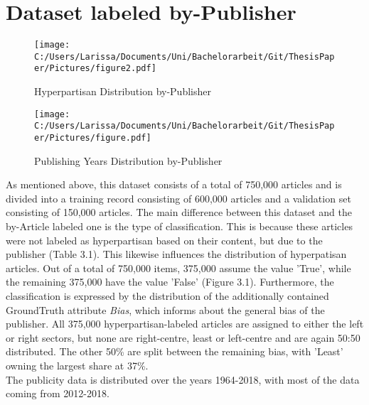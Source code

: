 \documentclass[a4paper, 11pt,titlepage,oneside,openany]{book}
\begin{document}
\section{Dataset labeled by-Publisher}
\begin{figure}[h]
	\begin{minipage}{.45\linewidth}
		\texttt{[image: C:/Users/Larissa/Documents/Uni/Bachelorarbeit/Git/ThesisPaper/Pictures/figure2.pdf]}
		\caption{Hyperpartisan Distribution by-Publisher}
	\end{minipage}
	\hspace{.1\linewidth}%
	\begin{minipage}{.45\linewidth}
		\texttt{[image: C:/Users/Larissa/Documents/Uni/Bachelorarbeit/Git/ThesisPaper/Pictures/figure.pdf]}
		\caption{Publishing Years Distribution by-Publisher}
	\end{minipage}
\end{figure} As mentioned above, this dataset consists of a total of 750,000 articles and is divided into a training record consisting of 600,000 articles and a validation set consisting of 150,000 articles.
The main difference between this dataset and the by-Article labeled one is the type of classification. This is because these articles were not labeled as hyperpartisan based on their content, but due to the publisher (Table 3.1). This likewise influences the distribution of hyperpatisan articles.
 Out of a total of 750,000 items, 375,000 assume the value 'True', while the remaining 375,000 have the value 'False' (Figure 3.1). 
Furthermore, the classification is expressed by the distribution of the additionally contained GroundTruth attribute \textit{Bias}, which informs about the general bias of the publisher. All 375,000 hyperpartisan-labeled articles are assigned to either the left or right sectors, but none are right-centre, least or left-centre and are again 50:50 distributed. The other 50\% are split between the remaining bias, with 'Least' owning the largest share at 37\%.\\
The publicity data is distributed over the years 1964-2018, with most of the data coming from 2012-2018.
\end{document}
